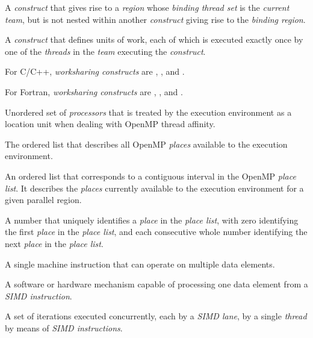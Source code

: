 \glossarydefstart
A \emph{construct} that gives rise to a \emph{region} whose \emph{binding thread set} is the \emph{current 
team}, but is not nested within another \emph{construct} giving rise to the \emph{binding region}.
\glossarydefend

\glossarydefstart
A \emph{construct} that defines units of work, each of which is executed exactly once by 
one of the \emph{threads} in the \emph{team} executing the \emph{construct}.

For C/C++, \emph{worksharing constructs} are , , and .

For Fortran, \emph{worksharing constructs} are , ,  and 
.
\glossarydefend


\glossarydefstart
Unordered set of \emph{processors} that is treated by the execution environment as a 
location unit when dealing with OpenMP thread affinity.
\glossarydefend

\glossarydefstart
The ordered list that describes all OpenMP \emph{places} available to the execution 
environment.
\glossarydefend

\glossarydefstart
An ordered list that corresponds to a contiguous interval in the OpenMP \emph{place list}. 
It describes the \emph{places} currently available to the execution environment for a given 
parallel region.
\glossarydefend

\glossarydefstart
A number that uniquely identifies a \emph{place} in the \emph{place list}, with zero identifying the first \emph{place} in the \emph{place list}, and each consecutive whole number identifying the next \emph{place} in the \emph{place list}.
\glossarydefend

\glossarydefstart
A single machine instruction that can operate on multiple data elements.
\glossarydefend

\glossarydefstart
A software or hardware mechanism capable of processing one data element from a 
\emph{SIMD instruction}.
\glossarydefend

\glossarydefstart
A set of iterations executed concurrently, each by a \emph{SIMD lane}, by a single \emph{thread}
by means of \emph{SIMD instructions}.
\glossarydefend


%
%
